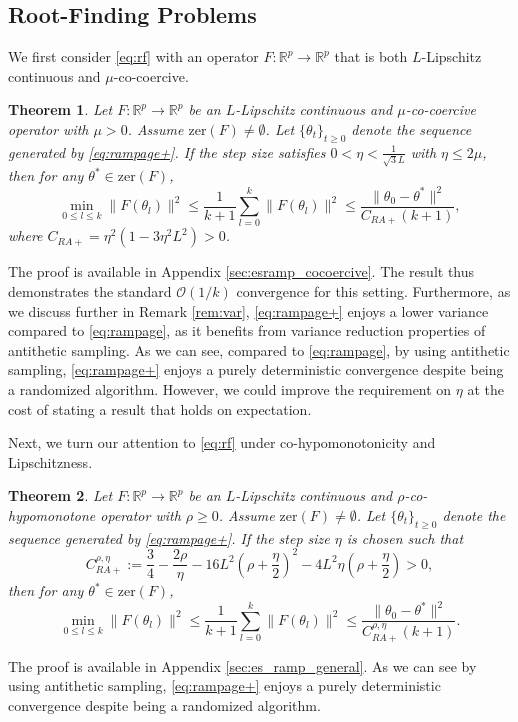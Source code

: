 \documentclass[letter,11pt]{article}
\newtheorem{theorem}{Theorem}[]
\begin{document}
\subsection{Root-Finding Problems}
We first consider \eqref{eq:rf} with an operator $F: \mathbb{R}^p \to \mathbb{R}^p$ that is both $L$-Lipschitz continuous and $\mu$-co-coercive. 

\begin{theorem} \label{thm:esramp_cocoercive}
Let $F: \mathbb{R}^p \to \mathbb{R}^p$ be an $L$-Lipschitz continuous and $\mu$-co-coercive operator with $\mu > 0$. Assume $\mathrm{zer}(F) \neq \emptyset$. Let $\{\theta_t\}_{t \ge 0}$ denote the sequence generated by \eqref{eq:rampage+}. If the step size satisfies $0 < \eta <\frac{1}{\sqrt{3}L}$ with $\eta \leq 2\mu$, then for any $\theta^* \in \mathrm{zer}(F)$,
\begin{equation}
\min_{0 \le l \le k} \|F(\theta_l)\|^2 \le \frac{1}{k+1} \sum_{l=0}^k \|F(\theta_l)\|^2 \le \frac{\|\theta_0 - \theta^*\|^2}{C_{RA+} (k+1)},
\end{equation}
where $C_{RA+} = \eta^2 \left( 1 - 3\eta^2 L^2 \right) > 0$.
\end{theorem}
The proof is available in Appendix \ref{sec:esramp_cocoercive}. The result thus demonstrates the standard $\mathcal{O}(1/k)$ convergence for this setting. Furthermore, as we discuss further in Remark \ref{rem:var}, \eqref{eq:rampage+} enjoys a lower variance compared to \eqref{eq:rampage}, as it benefits from variance reduction properties of antithetic sampling. As we can see, compared to \eqref{eq:rampage}, by using antithetic sampling, \eqref{eq:rampage+} enjoys a purely deterministic convergence despite being a randomized algorithm. However, we could improve the requirement on $\eta$ at the cost of stating a result that holds on expectation.

Next, we turn our attention to \eqref{eq:rf} under co-hypomonotonicity and Lipschitzness.
\begin{theorem} \label{thm:es_ramp_general}
Let $F: \mathbb{R}^p \to \mathbb{R}^p$ be an $L$-Lipschitz continuous and $\rho$-co-hypomonotone operator with $\rho \ge 0$. Assume $\mathrm{zer}(F) \neq \emptyset$. Let $\{\theta_t\}_{t \ge 0}$ denote the sequence generated by \eqref{eq:rampage+}. If the step size $\eta$ is chosen such that
\begin{equation}
C_{RA+}^{\rho,\eta} := \frac{3}{4} - \frac{2\rho}{\eta} - 16L^2 \left(\rho + \frac{\eta}{2}\right)^2 - 4L^2\eta \left(\rho + \frac{\eta}{2}\right) > 0,
\end{equation}
then for any $\theta^* \in \mathrm{zer}(F)$,
\begin{equation}
\min_{0 \le l \le k} \|F(\theta_l)\|^2 \le \frac{1}{k+1} \sum_{l=0}^k \|F(\theta_l)\|^2 \le \frac{\|\theta_0 - \theta^*\|^2}{C_{RA+}^{\rho,\eta} (k+1)}.
\end{equation}
\end{theorem}
The proof is available in Appendix \ref{sec:es_ramp_general}. As we can see by using antithetic sampling, \eqref{eq:rampage+} enjoys a purely deterministic convergence despite being a randomized algorithm.
\end{document}
